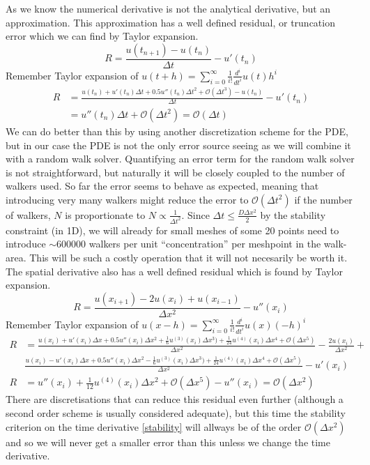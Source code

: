 As we know the numerical derivative is not the analytical derivative, but an approximation. 
This approximation has a well defined residual, or truncation error which we can find by Taylor expansion.
\begin{equation*}
  R = \frac{u(t_{n+1}) -u(t_n)}{\Delta t} -u'(t_n)
\end{equation*}
Remember Taylor expansion of $u(t+h) = \sum\limits_{i=0}^\infty\frac{1}{i!}\frac{d^i}{dt^i}u(t)h^i$
\begin{align*}
 R &= \frac{u(t_n)+u'(t_n)\Delta t +0.5u''(t_n)\Delta t^2 + \mathcal{O}(\Delta t^3)-u(t_n)}{\Delta t} -u'(t_n)\\
  &= u''(t_n)\Delta t+ \mathcal{O}(\Delta t^2) = \mathcal{O}(\Delta t)
\end{align*}
We can do better than this by using another discretization scheme for the PDE, but in our case the PDE is not the only error source seeing as we will combine it with a random walk solver. 
Quantifying an error term for the random walk solver is not straightforward, but naturally it will be closely coupled to the number of walkers used. 
So far the error seems to behave as expected, meaning that introducing very many walkers might reduce the error to $\mathcal{O}(\Delta t^2)$ if the number of walkers, $N$ is proportionate to $N\propto\frac{1}{\Delta t^2}$. 
Since $\Delta t \leq\frac{D\Delta x^2}{2}$ by the stability constraint (in 1D), we will already for small meshes of some 20 points need to introduce $\sim600000$ walkers per unit ``concentration'' per meshpoint in the walk-area. 
This will be such a costly operation that it will not necesarily be worth it.\\
The spatial derivative also has a well defined residual which is found by Taylor expansion.
\begin{equation}
R = \frac{u(x_{i+1})-2u(x_i)+u(x_{i-1})}{\Delta x^2}-u''(x_i) 
\end{equation}
Remember Taylor expansion of $u(x-h) = \sum\limits_{i=0}^\infty\frac{1}{i!}\frac{d^i}{dt^i}u(x)(-h)^i$
\begin{align*}
 R &= \frac{u(x_i)+u'(x_i)\Delta x +0.5u''(x_i)\Delta x^2 + \frac{1}{6}u^{(3)}(x_i)\Delta x^3) +\frac{1}{24}u^{(4)}(x_i)\Delta x^4 +\mathcal{O}(\Delta x^5)}{\Delta x^2}-\frac{2u(x_i)}{\Delta x^2}+\\
 &\frac{u(x_i)-u'(x_i)\Delta x +0.5u''(x_i)\Delta x^2 - \frac{1}{6}u^{(3)}(x_i)\Delta x^3) +\frac{1}{24}u^{(4)}(x_i)\Delta x^4 +\mathcal{O}(\Delta x^5)}{\Delta x^2} -u'(x_i)\\
R &= u''(x_i) +\frac{1}{12}u^{(4)}(x_i)\Delta x^2 + \mathcal{O}(\Delta x^5)  -u''(x_i) = \mathcal{O}(\Delta x^2) 
\end{align*}
There are discretisations that can reduce this residual even further (although a second order scheme is usually considered adequate), but this time the stability criterion on the time derivative \ref{stability} will allways be of the order $\mathcal{O}(\Delta x^2)$ and so we will never get a smaller error than this unless we change the time derivative.


